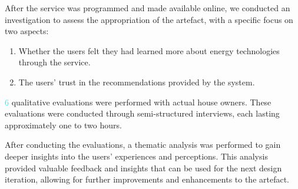 After the service was programmed and made available online, 
we conducted an investigation to assess the appropriation of the artefact,
with a specific focus on two aspects:
\begin{enumerate}
    \item Whether the users felt they had learned more about energy technologies through the service.
    \item The users' trust in the recommendations provided by the system. 
\end{enumerate}
\textcolor{cyan}{6} qualitative evaluations were performed with actual house owners. 
These evaluations were conducted through semi-structured interviews, 
each lasting approximately one to two hours. 

After conducting the evaluations, a thematic analysis was performed to gain deeper insights into the users' experiences and perceptions. 
This analysis provided valuable feedback and insights that can be used for the next design iteration, allowing for further improvements and enhancements to the artefact. 

